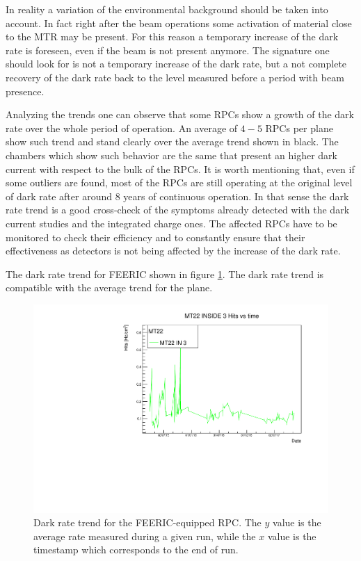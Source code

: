In reality a variation of the environmental background should be taken into account.
In fact right after the beam operations some activation of material close to the MTR may be present.
For this reason a temporary increase of the dark rate is foreseen, even if the beam is not present anymore.
The signature one should look for is not a temporary increase of the dark rate, but a not complete recovery of the dark rate back to the level measured before a period with beam presence.

Analyzing the trends one can observe that some RPCs show a growth of the dark rate over the whole period of operation.
An average of $4-5$ RPCs per plane show such trend and stand clearly over the average trend shown in black.
The chambers which show such behavior are the same that present an higher dark current with respect to the bulk of the RPCs.
It is worth mentioning that, even if some outliers are found, most of the RPCs are still operating at the original level of dark rate after around 8 years of continuous operation.
In that sense the dark rate trend is a good cross-check of the symptoms already detected with the dark current studies and the integrated charge ones.
The affected RPCs have to be monitored to check their efficiency and to constantly ensure that their effectiveness as detectors is not being affected by the increase of the dark rate.

The dark rate trend for FEERIC shown in figure \ref{fig:FEERICDarkRate}.
The dark rate trend is compatible with the average trend for the plane.

\begin{figure}[!t]
\begin{center}
\includegraphics[width=0.95\linewidth]{Chapters/Performance/Figs/DarkRateFEERIC.pdf}
\caption{Dark rate trend for the FEERIC-equipped RPC. The $y$ value is the average rate measured during a given run, while the $x$ value is the timestamp which corresponds to the end of run.}
\label{fig:FEERICDarkRate}
\end{center}
\end{figure}

